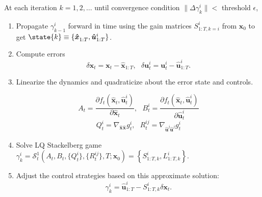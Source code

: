 \documentclass[11pt]{article}
\newcommand\dd[2]{\frac{\partial#1}{\partial#2}}
\newcommand\truestate[1]{\bm{x}_{#1}}
\newcommand\stack[2]{\mathcal{S}^{#1}_{#2}}
\newcommand\ctrl[2]{\bm{u}^{#1}_{#2}}
\newcommand\horizon{T}
\newcommand\stackmeas[2]{\bm{\hat{x}}^{#1}_{#2}}
\newcommand\ctrlhat[2]{\bm{\hat{u}}^{#1}_{#2}}
\begin{document}
At each iteration $k = 1, 2, \ldots$ until convergence condition $\| \Delta \gamma^i_{k} \| < $ threshold $\epsilon$,
\begin{enumerate}
\item Propagate $\gamma^i_{k-1}$ forward in time using the gain matrices $S^i_{1:T, k=i}$ from $\truestate{0}$ to get $\state{k} \equiv \{ \stackmeas{}{1:\horizon}, \ctrlhat{i}{1:\horizon} \}$.

\item Compute errors
\[ \delta \truestate{t} = \truestate{t} - \stackmeas{}{1:\horizon}, ~~~ \delta \ctrl{i}{t} = \ctrl{i}{t} -  \ctrlhat{i}{1:\horizon}. \]

\item Linearize the dynamics and quadraticize about the error state and controls.

\[ A_t = \dd{f_t(\stackmeas{}{t}, \ctrlhat{i}{t})}{\stackmeas{}{t}}, ~~~ B^i_t = \dd{f_t(\stackmeas{}{t}, \ctrlhat{i}{t})}{\ctrlhat{i}{t}} \]
\[ Q^i_t = \nabla_{\stackmeas{}{}\stackmeas{}{}} g^i_t, ~~~ R^{ij}_t = \nabla_{\ctrlhat{j}{}\ctrlhat{j}{}} g^i_t \]

\item Solve LQ Stackelberg game $\gamma^i_{k} = \stack{1}{t}(A_t, B_t, \{ Q^i_t \}, \{ R^{ij}_t \}, \horizon; \truestate{0}) = \left\{ S^i_{1:T, k}, L^i_{1:T, k} \right\}$.

\item Adjust the control strategies based on this approximate solution:
\[ \gamma^i_k = \ctrlhat{i}{1:T} - S^i_{1:T, k} \delta\truestate{t}.  \]
\end{enumerate}
\end{document}
